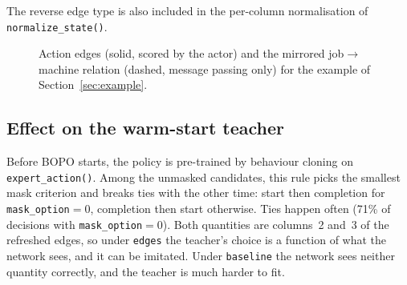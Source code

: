 \documentclass[11pt,a4paper]{article}
\newcommand{\code}[1]{\texttt{#1}}
\theoremstyle{remark}
\begin{document}
The reverse edge type is also included in the per-column normalisation of
\code{normalize\_state()}.

\begin{figure}[ht]
\centering
{}
\caption{Action edges (solid, scored by the actor) and the mirrored job$\to$machine
relation (dashed, message passing only) for the example of Section~\ref{sec:example}.}
\end{figure}

\subsection{Effect on the warm-start teacher}
Before BOPO starts, the policy is pre-trained by behaviour cloning on
\code{expert\_action()}. Among the unmasked candidates, this rule picks the smallest
mask criterion and breaks ties with the other time: start then completion for
\code{mask\_option}$=0$, completion then start otherwise. Ties happen often (71\% of
decisions with \code{mask\_option}$=0$). Both quantities are columns~2 and~3 of the
refreshed edges, so under \code{edges} the teacher's choice is a function of what the
network sees, and it can be imitated. Under \code{baseline} the network sees neither
quantity correctly, and the teacher is much harder to fit.
\end{document}
